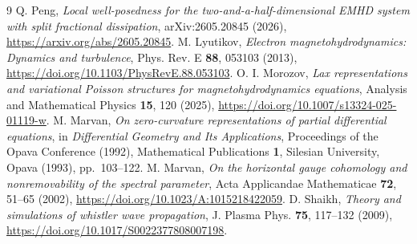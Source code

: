 \documentclass[11pt,a4paper]{article}
\begin{document}
\begin{thebibliography}{9}
 Q. Peng, \emph{Local well-posedness for the two-and-a-half-dimensional EMHD system with split fractional dissipation}, arXiv:2605.20845 (2026), \url{https://arxiv.org/abs/2605.20845}.
 M. Lyutikov, \emph{Electron magnetohydrodynamics: Dynamics and turbulence}, Phys. Rev. E \textbf{88}, 053103 (2013), \url{https://doi.org/10.1103/PhysRevE.88.053103}.
 O. I. Morozov, \emph{Lax representations and variational Poisson structures for magnetohydrodynamics equations}, Analysis and Mathematical Physics \textbf{15}, 120 (2025), \url{https://doi.org/10.1007/s13324-025-01119-w}.
 M. Marvan, \emph{On zero-curvature representations of partial differential equations}, in \emph{Differential Geometry and Its Applications}, Proceedings of the Opava Conference (1992), Mathematical Publications \textbf{1}, Silesian University, Opava (1993), pp.~103--122.
 M. Marvan, \emph{On the horizontal gauge cohomology and nonremovability of the spectral parameter}, Acta Applicandae Mathematicae \textbf{72}, 51--65 (2002), \url{https://doi.org/10.1023/A:1015218422059}.
 D. Shaikh, \emph{Theory and simulations of whistler wave propagation}, J. Plasma Phys. \textbf{75}, 117--132 (2009), \url{https://doi.org/10.1017/S0022377808007198}.
\end{thebibliography}
\end{document}
